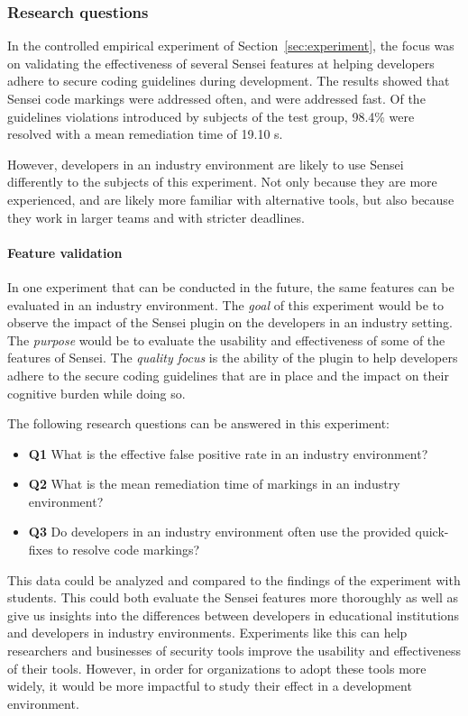 \subsubsection{Research questions}
In the controlled empirical experiment of Section~\ref{sec:experiment}, the focus was on validating the effectiveness of several Sensei features at helping developers adhere to secure coding guidelines during development.
The results showed that Sensei code markings were addressed often, and were addressed fast. 
Of the guidelines violations introduced by subjects of the test group, 98.4\% were resolved with a mean remediation time of 19.10 s.

However, developers in an industry environment are likely to use Sensei differently to the subjects of this experiment.
Not only because they are more experienced, and are likely more familiar with alternative tools, but also because they work in larger teams and with stricter deadlines.

\paragraph{Feature validation}
In one experiment that can be conducted in the future, the same features can be evaluated in an industry environment.
The \textit{goal} of this experiment would be to observe the impact of the Sensei plugin on the developers in an industry setting.
The \textit{purpose} would be to evaluate the usability and effectiveness of some of the features of Sensei.
The \textit{quality focus} is the ability of the plugin to help developers adhere to the secure coding guidelines that are in place and the impact on their cognitive burden while doing so.

The following research questions can be answered in this experiment:
\begin{itemize}
    \item \textbf{Q1} What is the effective false positive rate in an industry environment?
    \item \textbf{Q2} What is the mean remediation time of markings in an industry environment?
    \item \textbf{Q3} Do developers in an industry environment often use the provided quick-fixes to resolve code markings?
\end{itemize}

This data could be analyzed and compared to the findings of the experiment with students.
This could both evaluate the Sensei features more thoroughly as well as give us insights into the differences between developers in educational institutions and developers in industry environments.
Experiments like this can help researchers and businesses of security tools improve the usability and effectiveness of their tools.
However, in order for organizations to adopt these tools more widely, it would be more impactful to study their effect in a development environment.

